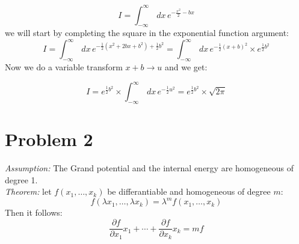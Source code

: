 \documentclass[a4paper]{article}
\begin{document}
\begin{equation}
I=\int_{-\infty}^\infty\,dx\,e^{-\frac{x^2}{2}-bx}
\end{equation}
we will start by completing the square in the exponential function argument: 
\begin{equation}
I=\int_{-\infty}^\infty\,dx\,e^{-\frac{1}{2}(x^2+2bx+b^2)+\frac{1}{2}b^2}=\int_{-\infty}^\infty\,dx\,e^{-\frac{1}{2}(x+b)^2}\times e^{\frac{1}{2}b^2}
\end{equation}
Now we do a variable transform $x+b \rightarrow u$ and we get:
\begin{framed}
\begin{equation}
I=e^{\frac{1}{2}b^2}\times\int_{-\infty}^\infty\,dx\,e^{-\frac{1}{2}u^2}=e^{\frac{1}{2}b^2}\times \sqrt{2\pi}
\end{equation}
\end{framed}

\section{Problem 2}
\emph{Assumption:} The Grand potential and the internal energy are homogeneous of degree 1.
\\ ${}$ \\
\emph{Theorem:} let $f(x_1,\dots,x_k)$ be differantiable and homogeneous of degree $m$:
\begin{equation}
f(\lambda x_1,\dots,\lambda x_k)=\lambda^mf(x_1,\dots,x_k)
\end{equation}
Then it follows:
\begin{equation}
\frac{\partial f}{\partial x_1}x_1+\cdots+\frac{\partial f}{\partial x_k}x_k=mf
\end{equation}
\end{document}
